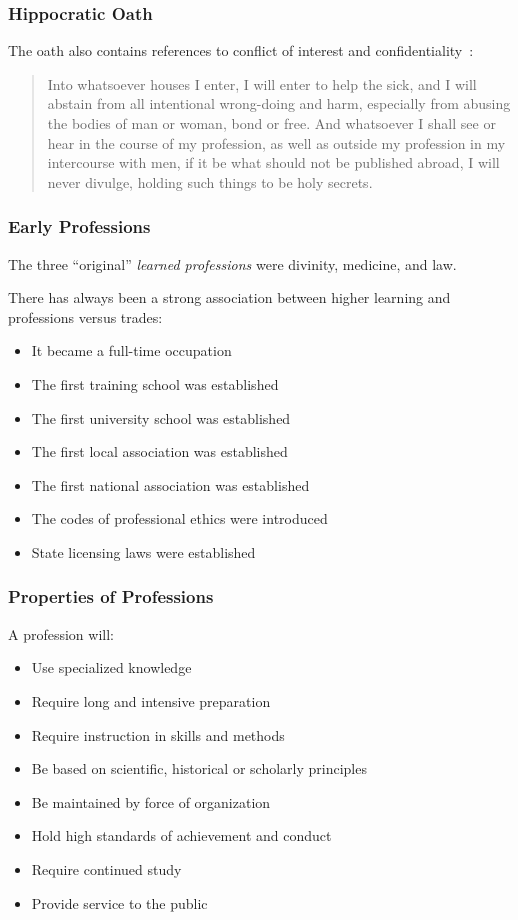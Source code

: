 \begin{frame}
\frametitle{Hippocratic Oath}

The oath also contains references to conflict of interest and confidentiality~\cite{hippocratic}:

\begin{quote}
Into whatsoever houses I enter, I will enter to help the sick, and I will abstain from all intentional wrong-doing and harm, especially from abusing the bodies of man or woman, bond or free. And whatsoever I shall see or hear in the course of my profession, as well as outside my profession in my intercourse with men, if it be what should not be published abroad, I will never divulge, holding such things to be holy secrets.
\end{quote}

\end{frame}



\begin{frame}
\frametitle{Early Professions}


The three ``original'' \textit{learned professions} were divinity, medicine, and law.


There has always been a strong association between higher learning and professions versus trades:
\begin{itemize}
\item It became a full-time occupation
\item The first training school was established
\item The first university school was established
\item The first local association was established
\item The first national association was established
\item The codes of professional ethics were introduced
\item State licensing laws were established
\end{itemize}

\end{frame}



\begin{frame}
\frametitle{Properties of Professions}

A profession will:

\begin{itemize}
\item Use specialized knowledge
\item Require long and intensive preparation
\item Require instruction in skills and methods
\item Be based on scientific, historical or scholarly principles
\item Be maintained by force of organization
\item Hold high standards of achievement and conduct
\item Require continued study
\item Provide service to the public
\end{itemize}


\end{frame}



